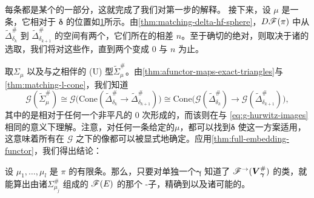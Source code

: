 每条\trVanishingPath{}都是某个\trDistinguishedBasis{}的一部分，这就完成了我们对第一步的解释。
接下来，设 $\mu$ 是一条\trMatchingPath，它相对于 $\boldsymbol{\delta}$ 的位置如\cref{fig:matching-path-position}所示。由\cref{thm:matching-delta-hf-sphere}，$D\mathscr{F}(\pi)$ 中从 $\widetilde{\Delta}^{\#}_{\delta_k}$ 到 $\widetilde{\Delta}^{\#}_{\delta_{k+1}}$ 的\trMorphism{}空间有两个\trGenerator，它们所在的\trDegree{}相差 $n$。至于确切的绝对\trDegree，则取决于诸\trGrading{}的选取，我们将对这些\trGrading{}作\trTranslation，直到两个\trDegree{}变成 $0$ 与 $n$ 为止。
\begin{figure}[htbp]
\centering
{}
\caption{}\label{fig:matching-path-position}
\end{figure}
取\trMatchingCycle{}$\Sigma_\mu$ 以及与之相伴的 (U) 型\trEquivariant\trBrane{}$\widetilde{\Sigma}^{\#}_\mu$。由\cref{thm:afunctor-maps-exact-triangles}与\cref{thm:matching-l-cone}，我们知道
\begin{equation*}
\mathscr{G}(\widetilde{\Sigma}^{\#}_\mu)\cong\mathscr{G}\bigl(\mathrm{Cone}(\widetilde{\Delta}^{\#}_{\delta_k}\to\widetilde{\Delta}^{\#}_{\delta_{k+1}})\bigr)\cong\mathrm{Cone}\bigl(\mathscr{G}(\widetilde{\Delta}^{\#}_{\delta_k})\to\mathscr{G}(\widetilde{\Delta}^{\#}_{\delta_{k+1}})\bigr),
\end{equation*}
其中的\trCone{}是相对于任何一个非平凡的 $0$ 次\trMorphism{}形成的，而该\trIsomorphism{}则在与 \eqref{eq:g-hurwitz-images} 相同的意义下理解。注意，对任何一条给定的\trMatchingPath{}$\mu$，都可以找到\trDistinguishedBasis{}$\boldsymbol{\delta}$ 使这一方案适用，这意味着所有\trMatchingCycle{}在 $\mathscr{G}$ 之下的像都可以被显式地确定。应用\cref{thm:full-embedding-functor}，我们得出结论：
\begin{corollary}\label{thm:matching-cycles-computable}
设 $\mu_1,\ldots,\mu_l$ 是 $\pi$ 的有限条\trMatchingPath。那么，只要对单独一个\trDistinguishedBasis{}$\boldsymbol{\gamma}$ 知道了 $\mathscr{F}^{\rightarrow}(\boldsymbol{V}^{\#}_{\boldsymbol{\gamma}})$ 的\trQuasiisomorphism{}类，就能算出由诸\trMatchingCycle{}$\Sigma^{\#}_{\mu_j}$ 组成的 $\mathscr{F}(E)$ 的那个\trFull{} \trAinfty-子\trCategory，精确到\trQuasiisomorphism{}以及诸\trObject{}可能的\trTranslation。
\end{corollary}
\noqed
